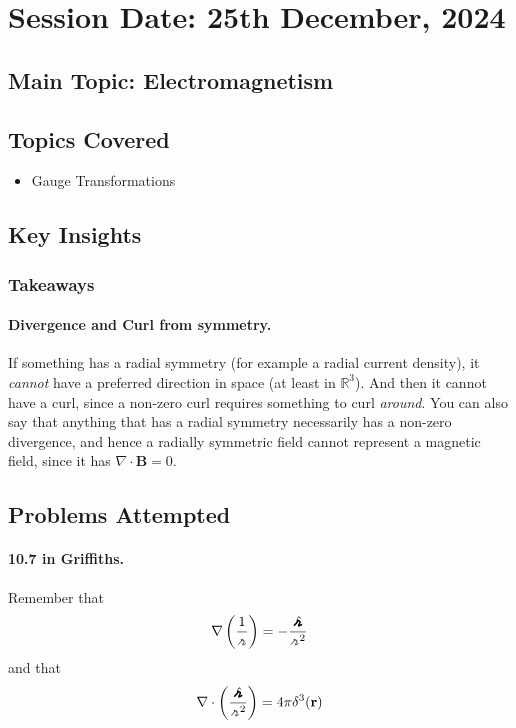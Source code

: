 \section{Session Date: 25th December, 2024}
\subsection*{Main Topic: Electromagnetism}
\subsection*{Topics Covered}
\begin{itemize}
    \item Gauge Transformations
\end{itemize}

\subsection*{Key Insights}
\subsubsection*{Takeaways}
\paragraph{Divergence and Curl from symmetry.} If something has a radial symmetry (for example a radial current density), it \textit{cannot} have a preferred direction in space (at least in \(\mathbb{R}^3\)). And then it cannot have a curl, since a non-zero curl requires something to curl \textit{around}. You can also say that anything that has a radial symmetry necessarily has a non-zero divergence, and hence a radially symmetric field cannot represent a magnetic field, since it has \(\nabla \cdot \mathbf{B} = 0\). 

\subsection*{Problems Attempted}
\paragraph{10.7 in Griffiths.} Remember that \begin{align*}
    \nabla \left( \frac{1}{\griffr[2] } \right) = - \frac{\hatgriffr }{\griffr[2] ^{2} }
\end{align*}
and that \begin{align*}
    \nabla \cdot \left( \frac{\hatgriffr }{\griffr[2] ^{2} } \right) = 4 \pi \delta ^{3}(\mathbf{r})
\end{align*}

